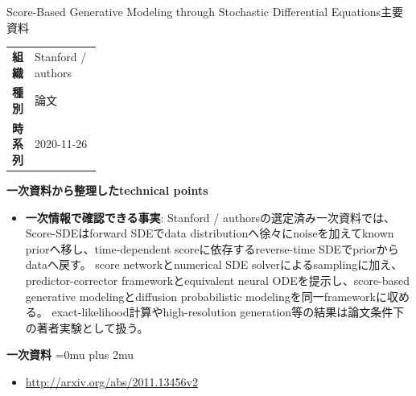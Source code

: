 \begin{technicalnote}{Score-Based Generative Modeling through Stochastic Differential Equations}{主要資料}
\begingroup
\begin{tabularx}{\linewidth}{@{}>{\bfseries}p{0.22\linewidth}X@{}}
組織 & Stanford / authors \\
種別 & 論文 \\
時系列 & 2020-11-26 \\
\end{tabularx}
\smallskip
\begin{minipage}{\linewidth}
{\bfseries 一次資料から整理したtechnical points}
\begin{minipage}{\linewidth}
\begin{itemize}[leftmargin=1.5em,itemsep=0.35em]
\item \textbf{一次情報で確認できる事実}: Stanford / authorsの選定済み一次資料では、Score-SDEはforward SDEでdata distributionへ徐々にnoiseを加えてknown priorへ移し、time-dependent scoreに依存するreverse-time SDEでpriorからdataへ戻す。 score networkとnumerical SDE solverによるsamplingに加え、predictor-corrector frameworkとequivalent neural ODEを提示し、score-based generative modelingとdiffusion probabilistic modelingを同一frameworkに収める。 exact-likelihood計算やhigh-resolution generation等の結果は論文条件下の著者実験として扱う。
\end{itemize}
\begin{samepage}
{\bfseries 一次資料}
\begingroup\sloppy
\Urlmuskip=0mu plus 2mu\relax
\begin{itemize}[leftmargin=1.5em,itemsep=0.25em]
\item {\scriptsize\url{http://arxiv.org/abs/2011.13456v2}}
\end{itemize}
\endgroup
\end{samepage}
\end{minipage}
\end{minipage}
\endgroup
\end{technicalnote}
\medskip

